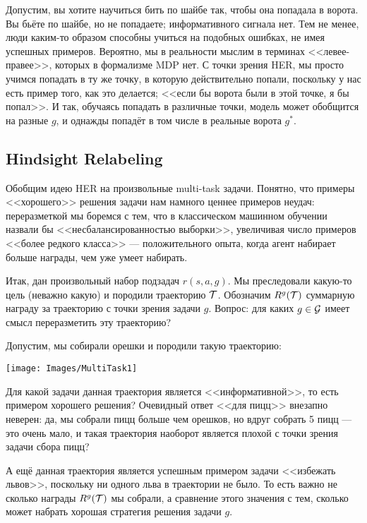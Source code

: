 \begin{exampleBox}[righthand ratio=0.3, sidebyside, sidebyside align=center, lower separated=false]{}
Допустим, вы хотите научиться бить по шайбе так, чтобы она попадала в ворота. Вы бьёте по шайбе, но не попадаете; информативного сигнала нет. Тем не менее, люди каким-то образом способны учиться на подобных ошибках, не имея успешных примеров. Вероятно, мы в реальности мыслим в терминах <<левее-правее>>, которых в формализме MDP нет. С точки зрения HER, мы просто учимся попадать в ту же точку, в которую действительно попали, поскольку у нас есть пример того, как это делается; <<если бы ворота были в этой точке, я бы попал>>. И так, обучаясь попадать в различные точки, модель может обобщится на разные $g$, и однажды попадёт в том числе в реальные ворота $g^*$.

\tcblower
{}
\end{exampleBox}

\subsection{Hindsight Relabeling}

Обобщим идею HER на произвольные multi-task задачи. Понятно, что примеры <<хорошего>> решения задачи нам намного ценнее примеров неудач: переразметкой мы боремся с тем, что в классическом машинном обучении назвали бы <<несбалансированностью выборки>>, увеличивая число примеров <<более редкого класса>> --- положительного опыта, когда агент набирает больше награды, чем уже умеет набирать.

Итак, дан произвольный набор подзадач $r(s, a, g)$. Мы преследовали какую-то цель (неважно какую) и породили траекторию $\mathcal{T}$. Обозначим $R^g(\mathcal{T})$ суммарную награду за траекторию с точки зрения задачи $g$. Вопрос: для каких $g \in \mathcal{G}$ имеет смысл переразметить эту траекторию? 

\begin{exampleBox}[label=ex:multitask]{}
Допустим, мы собирали орешки и породили такую траекторию:

\begin{center}
    \texttt{[image: Images/MultiTask1]}
\end{center}

Для какой задачи данная траектория является <<информативной>>, то есть примером хорошего решения? Очевидный ответ <<для пицц>> внезапно неверен: да, мы собрали пицц больше чем орешков, но вдруг собрать 5 пицц --- это очень мало, и такая траектория наоборот является плохой с точки зрения задачи сбора пицц?

А ещё данная траектория является успешным примером задачи <<избежать львов>>, поскольку ни одного льва в траектории не было. То есть важно не сколько награды $R^g(\mathcal{T})$ мы собрали, а сравнение этого значения с тем, сколько может набрать хорошая стратегия решения задачи $g$.
\end{exampleBox}

